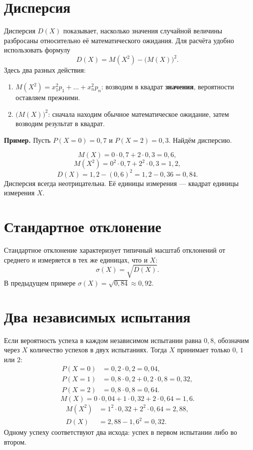 \documentclass[a4paper,12pt]{article}
\newcommand{\key}[1]{\textcolor{darkaccent}{#1}}
\newcommand{\Ex}[1]{\par\medskip\noindent\textcolor{darkaccent}{\textbf{Пример.}} #1\par\smallskip}
\begin{document}
\section{Дисперсия}
Дисперсия $D(X)$ показывает, насколько значения случайной величины разбросаны относительно её математического ожидания. Для расчёта удобно использовать формулу
\[
\boxed{D(X)=M(X^2)-\bigl(M(X)\bigr)^2.}
\]
Здесь два разных действия:
\begin{enumerate}[label=\arabic*.,itemsep=.2em]
\item $M(X^2)=x_1^2p_1+\ldots+x_n^2p_n$: возводим в квадрат \textbf{значения}, вероятности оставляем прежними.
\item $\bigl(M(X)\bigr)^2$: сначала находим обычное математическое ожидание, затем возводим результат в квадрат.
\end{enumerate}
\Ex{Пусть $P(X=0)=0{,}7$ и $P(X=2)=0{,}3$. Найдём дисперсию.}
\[
M(X)=0\cdot0{,}7+2\cdot0{,}3=0{,}6,
\]
\[
M(X^2)=0^2\cdot0{,}7+2^2\cdot0{,}3=1{,}2,
\]
\[
D(X)=1{,}2-(0{,}6)^2=1{,}2-0{,}36=\boxed{0{,}84}.
\]
\key{Дисперсия всегда неотрицательна.} Её единицы измерения --- квадрат единицы измерения $X$.

\section{Стандартное отклонение}
Стандартное отклонение характеризует типичный масштаб отклонений от среднего и измеряется в тех же единицах, что и $X$:
\[
\boxed{\sigma(X)=\sqrt{D(X)}.}
\]
В предыдущем примере $\sigma(X)=\sqrt{0{,}84}\approx0{,}92$.

\clearpage
\section{Два независимых испытания}
Если вероятность успеха в каждом независимом испытании равна $0{,}8$, обозначим через $X$ количество успехов в двух испытаниях. Тогда $X$ принимает только $0$, $1$ или $2$:
\[
\begin{aligned}
P(X=0)&=0{,}2\cdot0{,}2=0{,}04,\\
P(X=1)&=0{,}8\cdot0{,}2+0{,}2\cdot0{,}8=0{,}32,\\
P(X=2)&=0{,}8\cdot0{,}8=0{,}64.
\end{aligned}
\]
\[
M(X)=0\cdot0{,}04+1\cdot0{,}32+2\cdot0{,}64=\boxed{1{,}6}.
\]
\[
\begin{aligned}
M(X^2)&=1^2\cdot0{,}32+2^2\cdot0{,}64=2{,}88,\\
D(X)&=2{,}88-1{,}6^2=\boxed{0{,}32}.
\end{aligned}
\]
\key{Одному успеху соответствуют два исхода:} успех в первом испытании либо во втором.
\end{document}
